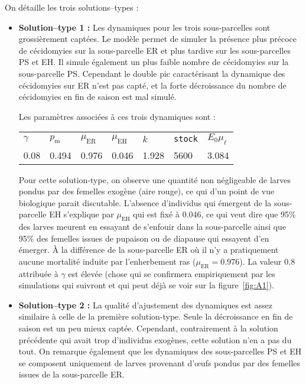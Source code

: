 On détaille les trois solutions--types :
\begin{itemize}
 \item \textbf{Solution--type 1 :} 
 Les dynamiques pour les trois sous-parcelles sont grossièrement captées.
 Le modèle permet de simuler la présence plus précoce de cécidomyies sur la sous-parcelle ER et plus tardive sur les sous-parcelles PS et EH. 
 Il simule également un plus faible nombre de cécidomyies sur la sous-parcelle PS.
 Cependant le double pic caractérisant la dynamique des cécidomyies sur ER n'est pas capté, et la forte décroissance du nombre de cécidomyies en fin de saison est mal simulé.
 
 Les paramètres associées à ces trois dynamiques sont :
 \begin{center}
\begin{tabular}{lllllll}
$\gamma$ & $p_{\text{m}}$ & $\mu_{\text{ER}}$ & $\mu_{\text{EH}}$ & $k$ & \texttt{stock} & $E_0\mu_{\ell}$\\
0.08 & 0.494 & 0.976 & 0.046 & 1.928 & 5600 & 3.084
 \end{tabular}
 \end{center}
 Pour cette solution-type, on observe une quantité non négligeable de larves pondus par des femelles exogène (aire rouge), ce qui d'un point de vue biologique parait discutable.
L'absence d'individus qui émergent de la sous-parcelle EH s'explique par $\mu_{\text{EH}}$ qui est fixé à 0.046, ce qui veut dire que 95\% des larves meurent en essayant de s'enfouir dans la sous-parcelle ainsi que 95\% des femelles issues de pupaison ou de diapause qui essayent d'en émerger.
À la différence de la sous-parcelle ER où il n'y a pratiquement aucune mortalité induite par l'enherbement ras ($\mu_{\text{ER}} = 0.976$).
La valeur 0.8 attribuée à $\gamma$ est élevée (chose qui se confirmera empiriquement par les simulations qui suivront et qui peut déjà se voir sur la figure~\ref{fig:A1}).

\item \textbf{Solution--type 2 :} La qualité d'ajustement des dynamiques est assez similaire à celle de la première solution-type. Seule la décroissance en fin de saison est un peu mieux captée. Cependant, contrairement à la solution précédente qui avait trop d'individus exogènes, cette solution n'en a pas du tout.
On remarque également que les dynamiques des sous-parcelles PS et EH se composent uniquement de larves provenant d'œufs pondus par des femelles issues de la sous-parcelle ER.


\end{itemize}
